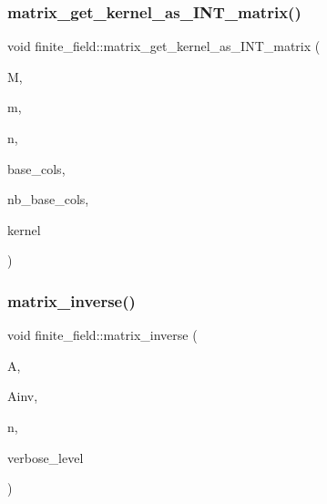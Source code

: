 \mbox{\label{classfinite__field_aca83f8d51c2319926df066763bae50aa}} 
\subsubsection{\texorpdfstring{matrix\+\_\+get\+\_\+kernel\+\_\+as\+\_\+\+I\+N\+T\+\_\+matrix()}{matrix\_get\_kernel\_as\_INT\_matrix()}}
{\footnotesize\ttfamily void finite\+\_\+field\+::matrix\+\_\+get\+\_\+kernel\+\_\+as\+\_\+\+I\+N\+T\+\_\+matrix (\begin{DoxyParamCaption}\item[{\mbox{\hyperlink{galois_8h_a09fddde158a3a20bd2dcadb609de11dc}{I\+NT}} $\ast$}]{M,  }\item[{\mbox{\hyperlink{galois_8h_a09fddde158a3a20bd2dcadb609de11dc}{I\+NT}}}]{m,  }\item[{\mbox{\hyperlink{galois_8h_a09fddde158a3a20bd2dcadb609de11dc}{I\+NT}}}]{n,  }\item[{\mbox{\hyperlink{galois_8h_a09fddde158a3a20bd2dcadb609de11dc}{I\+NT}} $\ast$}]{base\+\_\+cols,  }\item[{\mbox{\hyperlink{galois_8h_a09fddde158a3a20bd2dcadb609de11dc}{I\+NT}}}]{nb\+\_\+base\+\_\+cols,  }\item[{\mbox{\hyperlink{class_i_n_t__matrix}{I\+N\+T\+\_\+matrix}} $\ast$}]{kernel }\end{DoxyParamCaption})}

\mbox{\label{classfinite__field_a3ef088739ceac47367f4b328697726a5}} 
\subsubsection{\texorpdfstring{matrix\+\_\+inverse()}{matrix\_inverse()}}
{\footnotesize\ttfamily void finite\+\_\+field\+::matrix\+\_\+inverse (\begin{DoxyParamCaption}\item[{\mbox{\hyperlink{galois_8h_a09fddde158a3a20bd2dcadb609de11dc}{I\+NT}} $\ast$}]{A,  }\item[{\mbox{\hyperlink{galois_8h_a09fddde158a3a20bd2dcadb609de11dc}{I\+NT}} $\ast$}]{Ainv,  }\item[{\mbox{\hyperlink{galois_8h_a09fddde158a3a20bd2dcadb609de11dc}{I\+NT}}}]{n,  }\item[{\mbox{\hyperlink{galois_8h_a09fddde158a3a20bd2dcadb609de11dc}{I\+NT}}}]{verbose\+\_\+level }\end{DoxyParamCaption})}


